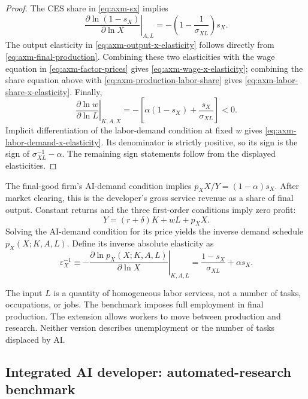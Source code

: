 \begin{proof}
The CES share in \eqref{eq:axm-sx} implies
\[
 \left.\frac{\partial\ln(1-s_X)}{\partial\ln X}\right|_{A,L}
 =-\left(1-\frac{1}{\sigma_{XL}}\right)s_X.
\]
The output elasticity in \eqref{eq:axm-output-x-elasticity} follows directly
from \eqref{eq:axm-final-production}. Combining these two elasticities with the
wage equation in \eqref{eq:axm-factor-prices} gives
\eqref{eq:axm-wage-x-elasticity}; combining the share equation above with
\eqref{eq:axm-production-labor-share} gives
\eqref{eq:axm-labor-share-x-elasticity}. Finally,
\[
 \left.\frac{\partial\ln w}{\partial\ln L}\right|_{K,A,X}
 =-\left[\alpha(1-s_X)+\frac{s_X}{\sigma_{XL}}\right]<0.
\]
Implicit differentiation of the labor-demand condition at fixed \(w\) gives
\eqref{eq:axm-labor-demand-x-elasticity}. Its denominator is strictly positive,
so its sign is the sign of \(\sigma_{XL}^{-1}-\alpha\). The remaining sign
statements follow from the displayed elasticities.
\end{proof}

The final-good firm's AI-demand condition implies
\(p_XX/Y=(1-\alpha)s_X\). After market clearing, this is the developer's gross
service revenue as a share of final output. Constant returns and the three
first-order conditions imply zero profit:
\begin{equation}
 Y=(r+\delta)K+wL+p_XX.
 \label{eq:axm-final-zero-profit}
\end{equation}
Solving the AI-demand condition for its price yields the inverse demand schedule
\(p_X(X;K,A,L)\). Define its inverse absolute elasticity as
\begin{equation}
 \varepsilon_X^{-1}
 \equiv-\left.\frac{\partial\ln p_X(X;K,A,L)}{\partial\ln X}\right|_{K,A,L}
 =\frac{1-s_X}{\sigma_{XL}}+\alpha s_X.
 \label{eq:axm-inverse-elasticity}
\end{equation}

\begin{remark}
The input \(L\) is a quantity of homogeneous labor services, not a number of
tasks, occupations, or jobs. The benchmark imposes full employment in final
production. The extension allows workers to move between production and
research. Neither version describes unemployment or the number of tasks
displaced by AI.
\end{remark}

\subsection{Integrated AI developer: automated-research benchmark}

